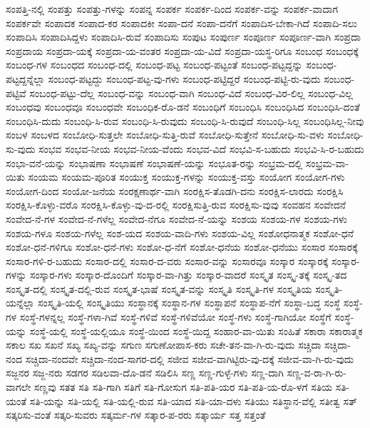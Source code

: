 {ಸಂಪತ್ತಿ-ನಲ್ಲಿ
ಸಂಪತ್ತು
ಸಂಪತ್ತು-ಗಳನ್ನು
ಸಂಪನ್ನ
ಸಂಪರ್ಕ
ಸಂಪರ್ಕ-ದಿಂದ
ಸಂಪರ್ಕ-ವನ್ನು
ಸಂಪರ್ಕ-ವಾದಾಗ
ಸಂಪರ್ಕವೇ
ಸಂಪಾದಕ
ಸಂಪಾದ-ಕರ
ಸಂಪಾದಕೀ
ಸಂಪಾ-ದನೆ
ಸಂಪಾ-ದನೆಗೆ
ಸಂಪಾದಿಸ-ಬೇಕಾ-ಗಿದೆ
ಸಂಪಾದಿ-ಸಲು
ಸಂಪಾದಿಸಿ
ಸಂಪಾದಿಸಿದ್ದಳು
ಸಂಪಾದಿಸಿ-ರುವೆ
ಸಂಪಾದಿಸು
ಸಂಪುಟ
ಸಂಪುರ್ಣ
ಸಂಪೂರ್ಣ
ಸಂಪೂರ್ಣ-ವಾಗಿ
ಸಂಪ್ರದಾ
ಸಂಪ್ರದಾಯ
ಸಂಪ್ರದಾ-ಯಕ್ಕೆ
ಸಂಪ್ರದಾ-ಯ-ವಂತರ
ಸಂಪ್ರದಾ-ಯ-ವಿದೆ
ಸಂಪ್ರದಾ-ಯಸ್ಥ-ರಿಗೂ
ಸಂಬಂಧ
ಸಂಬಂಧಕ್ಕೆ
ಸಂಬಂಧ-ಗಳ
ಸಂಬಂಧದ
ಸಂಬಂಧ-ದಲ್ಲಿ
ಸಂಬಂಧ-ಪಟ್ಟ
ಸಂಬಂಧ-ಪಟ್ಟಂತೆ
ಸಂಬಂಧ-ಪಟ್ಟದ್ದನ್ನು
ಸಂಬಂಧ-ಪಟ್ಟದ್ದನ್ನೆಲ್ಲಾ
ಸಂಬಂಧ-ಪಟ್ಟದ್ದು
ಸಂಬಂಧ-ಪಟ್ಟ-ವು-ಗಳು
ಸಂಬಂಧ-ಪಟ್ಟಿದ್ದರೆ
ಸಂಬಂಧ-ಪಟ್ಟಿ-ರು-ವುದು
ಸಂಬಂಧ-ಪಟ್ಟಿವೆ
ಸಂಬಂಧ-ಪಟ್ಟು-ದೆಲ್ಲ
ಸಂಬಂಧ-ವನ್ನು
ಸಂಬಂಧ-ವಾಗಿ
ಸಂಬಂಧ-ವಿದೆ
ಸಂಬಂಧ-ವಿರ-ಲಿಲ್ಲ
ಸಂಬಂಧ-ವಿಲ್ಲ
ಸಂಬಂಧವು
ಸಂಬಂಧವೂ
ಸಂಬಂಧವೇ
ಸಂಬಂಧಿಕ-ರೊ-ಡನೆ
ಸಂಬಂಧಿಗೆ
ಸಂಬಂಧಿಸಿ
ಸಂಬಂಧಿಸಿದ
ಸಂಬಂಧಿಸಿ-ದಂತೆ
ಸಂಬಂಧಿಸಿ-ದುದು
ಸಂಬಂಧಿ-ಸಿ-ರುವ
ಸಂಬಂಧಿ-ಸಿ-ರುವುದು
ಸಂಬಂಧಿ-ಸಿ-ರುವುದೆ
ಸಂಬಂಧಿ-ಸಿಲ್ಲ
ಸಂಬಂಧಿಸಿಲ್ಲ-ನೀವು
ಸಂಬಳ
ಸಂಬಳದ
ಸಂಬೋಧಿ-ಸುತ್ತಲೇ
ಸಂಬೋಧಿ-ಸುತ್ತಿ-ರುವೆ
ಸಂಬೋಧಿ-ಸುತ್ತೇನೆ
ಸಂಬೋಧಿ-ಸು-ವಳು
ಸಂಬೋಧಿ-ಸು-ವುದು
ಸಂಭವ
ಸಂಭವ-ನೀಯ
ಸಂಭವ-ನೀಯ-ವೆಂದು
ಸಂಭವ-ವಿದೆ
ಸಂಭವಿ-ಸ-ಬಹುದು
ಸಂಭವಿ-ಸಿ-ರ-ಬಹುದು
ಸಂಭಾ-ವನೆ-ಯನ್ನು
ಸಂಭಾಷಣಾ
ಸಂಭಾಷಣೆ
ಸಂಭಾಷಣೆ-ಯನ್ನು
ಸಂಭೂತ-ರನ್ನು
ಸಂಭ್ರಮ-ದಲ್ಲಿ
ಸಂಭ್ರಮ-ವಾ-ಯಿತು
ಸಂಯಮ
ಸಂಯಮ-ಪೂರಿತ
ಸಂಯುಕ್ತ
ಸಂಯುಕ್ತ-ಗಳನ್ನು
ಸಂಯುಕ್ತ-ವಸ್ತು
ಸಂಯೋಗ
ಸಂಯೋಗ-ಗಳು
ಸಂಯೋಗ-ದಿಂದ
ಸಂಯೋ-ಜನೆಯ
ಸಂರಕ್ಷಣಾರ್ಥ-ವಾಗಿ
ಸಂರಕ್ಷಿಸ-ತೊಡಗಿ-ದನು
ಸಂರಕ್ಷಿಸ-ಲಾರದು
ಸಂರಕ್ಷಿಸಿ
ಸಂರಕ್ಷಿಸಿ-ಕೊಳ್ಳು-ವರೊ
ಸಂರಕ್ಷಿಸಿ-ಕೊಳ್ಳು-ವು-ದ-ರಲ್ಲಿ
ಸಂರಕ್ಷಿಸುತ್ತಿ-ರುವ
ಸಂರಕ್ಷಿಸು-ವುವು
ಸಂವಹನ
ಸಂವೇದನೆ
ಸಂವೇದ-ನೆ-ಗಳ
ಸಂವೇದ-ನೆ-ಗಳೆಲ್ಲ
ಸಂವೇದ-ನೆಗೂ
ಸಂವೇದ-ನೆ-ಯನ್ನು
ಸಂಶಯ
ಸಂಶಯ-ಗಳ
ಸಂಶಯ-ಗಳು
ಸಂಶಯ-ಗಳೂ
ಸಂಶಯ-ಗಳೆಲ್ಲ
ಸಂಶ-ಯದ
ಸಂಶಯ-ವಾದಿ-ಗಳು
ಸಂಶಯ-ವಿಲ್ಲ
ಸಂಶೋಧನಾತ್ಮಕ
ಸಂಶೋ-ಧನೆ
ಸಂಶೋ-ಧನೆ-ಗಳಿಗೂ
ಸಂಶೋ-ಧನೆ-ಗಳು
ಸಂಶೋ-ಧ-ನೆಗೆ
ಸಂಶೋ-ಧನೆಯ
ಸಂಶೋ-ಧನೆಯು
ಸಂಸಾರ
ಸಂಸಾರಕ್ಕೆ
ಸಂಸಾರ-ಗಳಿ-ರ-ಬಹುದು
ಸಂಸಾರ-ದಲ್ಲಿ
ಸಂಸಾರ-ದ-ವರು
ಸಂಸಾರ-ವನ್ನು
ಸಂಸಾರವೂ
ಸಂಸ್ಕಾರ
ಸಂಸ್ಕಾರಕ್ಕೆ
ಸಂಸ್ಕಾರ-ಗಳನ್ನು
ಸಂಸ್ಕಾರ-ಗಳು
ಸಂಸ್ಕಾರ-ದೊಂದಿಗೆ
ಸಂಸ್ಕಾರ-ವಾ-ಗಿತ್ತು
ಸಂಸ್ಕಾರ-ವಾದರೆ
ಸಂಸ್ಕೃತ
ಸಂಸ್ಕೃ-ತಕ್ಕೆ
ಸಂಸ್ಕೃ-ತದ
ಸಂಸ್ಕೃತ-ದಲ್ಲಿ
ಸಂಸ್ಕೃತ-ದಲ್ಲಿ-ರುವ
ಸಂಸ್ಕೃತ-ಭಾಷೆ
ಸಂಸ್ಕೃತ-ವನ್ನು
ಸಂಸ್ಕೃತಿ
ಸಂಸ್ಕೃತಿ-ಗಳ
ಸಂಸ್ಕೃತಿಯ
ಸಂಸ್ಕೃತಿ-ಯನ್ನೆಲ್ಲಾ
ಸಂಸ್ಕೃತಿ-ಯಲ್ಲಿ
ಸಂಸ್ಕೃತಿಯು
ಸಂಸ್ಥಾನಕ್ಕೆ
ಸಂಸ್ಥಾನ-ಗಳ
ಸಂಸ್ಥಾಪನೆ
ಸಂಸ್ಥಾಪ-ನೆಗೆ
ಸಂಸ್ಥಾ-ಬದ್ಧ
ಸಂಸ್ಥೆ
ಸಂಸ್ಥೆ-ಗಳ
ಸಂಸ್ಥೆ-ಗಳನ್ನಲ್ಲ
ಸಂಸ್ಥೆ-ಗಳಾ-ಗಿವೆ
ಸಂಸ್ಥೆ-ಗಳಿವೆ
ಸಂಸ್ಥೆ-ಗಳಿವೆಯೋ
ಸಂಸ್ಥೆ-ಗಳು
ಸಂಸ್ಥೆ-ಗಾಗಿಯೋ
ಸಂಸ್ಥೆಗೆ
ಸಂಸ್ಥೆ-ಯನ್ನು
ಸಂಸ್ಥೆ-ಯಲ್ಲಿ
ಸಂಸ್ಥೆ-ಯಲ್ಲಿಯೂ
ಸಂಸ್ಥೆ-ಯಿಂದ
ಸಂಸ್ಥೆ-ಯಿದ್ದ
ಸಂಹಾರ-ವಾ-ಯಿತು
ಸಂಹಿತೆ
ಸಕಾರಾ
ಸಕಾರಾತ್ಮಕ
ಸಕಾಲ
ಸಖ
ಸಖನೆ
ಸಖ್ಯ
ಸಖ್ಯ-ವನ್ನು
ಸಗುಣ
ಸಗುಣೋಪಾಸ-ಕರು
ಸಚೇ-ತನ-ವಾ-ಗಿ-ರು-ವುದು
ಸಚ್ಚಿದಾ
ಸಚ್ಚಿದಾ-ನಂದ
ಸಚ್ಚಿದಾ-ನಂದವೇ
ಸಚ್ಚಿದಾ-ನಂದ-ಸಾಗರ-ದಲ್ಲಿ
ಸಜೀವ
ಸಜೀವ-ವಾಗಿಟ್ಟಿರು-ವು-ದಕ್ಕೆ
ಸಜೀವ-ವಾ-ಗಿ-ರು-ವುದು
ಸಜ್ಜನರ
ಸಜ್ಜ-ನರು
ಸಡಗರ
ಸಡಿಲವಾ-ದೊ-ಡನೆ
ಸಡಿಲಿಸಿ
ಸಣ್ಣ
ಸಣ್ಣ-ಗುಳ್ಳೆ-ಗಳು
ಸಣ್ಣ-ದಾಗಿ
ಸಣ್ಣ-ವ-ರಾ-ಗಿ-ರು-ವಾಗಲೇ
ಸಣ್ಣವು
ಸತತ
ಸತಿ
ಸತಿ-ಗಾಗಿ
ಸತಿಗೆ
ಸತಿ-ಗೋಸುಗ
ಸತಿ-ಪತಿ-ಯರ
ಸತಿ-ಪತಿ-ಯ-ರೊ-ಳಗೆ
ಸತಿಯ
ಸತಿ-ಯಂತೆ
ಸತಿ-ಯನ್ನು
ಸತಿ-ಯಲ್ಲಿ
ಸತಿ-ಯಲ್ಲಿ-ರುವ
ಸತಿ-ಯಾದ
ಸತಿ-ಯಾ-ದಳು
ಸತಿಯು
ಸತಿಸ್ಥಾನ-ವೆಲ್ಲಿ
ಸತೀತ್ವ
ಸತ್
ಸತ್ಕರಿಸು-ವಂತೆ
ಸತ್ಕರಿ-ಸುವರು
ಸತ್ಕರ್ಮ-ಗಳ
ಸತ್ಕಾರ-ಪ-ರರು
ಸತ್ಕಾರ್ಯ
ಸತ್ತ
ಸತ್ತಂತೆ
}

